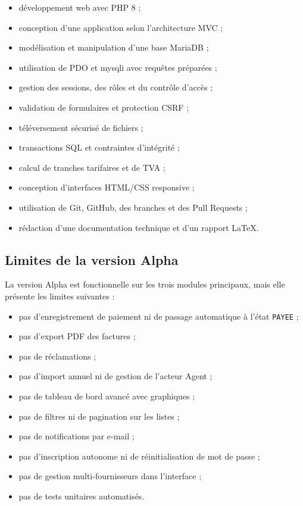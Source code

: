 \begin{itemize}[leftmargin=*]
  \item développement web avec PHP 8 ;
  \item conception d'une application selon l'architecture MVC ;
  \item modélisation et manipulation d'une base MariaDB ;
  \item utilisation de PDO et mysqli avec requêtes préparées ;
  \item gestion des sessions, des rôles et du contrôle d'accès ;
  \item validation de formulaires et protection CSRF ;
  \item téléversement sécurisé de fichiers ;
  \item transactions SQL et contraintes d'intégrité ;
  \item calcul de tranches tarifaires et de TVA ;
  \item conception d'interfaces HTML/CSS responsive ;
  \item utilisation de Git, GitHub, des branches et des Pull Requests ;
  \item rédaction d'une documentation technique et d'un rapport LaTeX.
\end{itemize}

\subsection{Limites de la version Alpha}

La version Alpha est fonctionnelle sur les trois modules principaux, mais elle présente les limites suivantes :

\begin{itemize}[leftmargin=*]
  \item pas d'enregistrement de paiement ni de passage automatique à l'état \texttt{PAYEE} ;
  \item pas d'export PDF des factures ;
  \item pas de réclamations ;
  \item pas d'import annuel ni de gestion de l'acteur Agent ;
  \item pas de tableau de bord avancé avec graphiques ;
  \item pas de filtres ni de pagination sur les listes ;
  \item pas de notifications par e-mail ;
  \item pas d'inscription autonome ni de réinitialisation de mot de passe ;
  \item pas de gestion multi-fournisseurs dans l'interface ;
  \item pas de tests unitaires automatisés.
\end{itemize}

